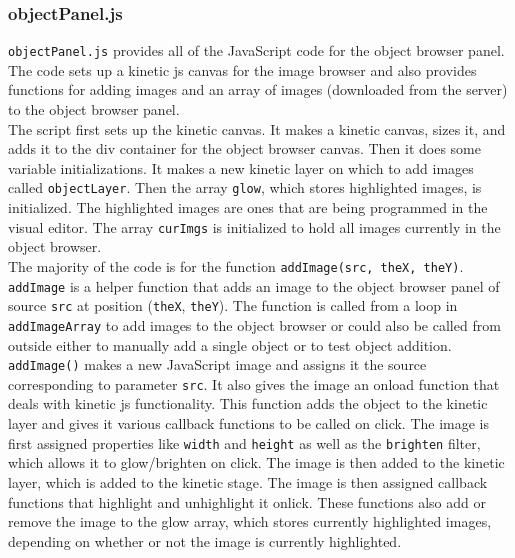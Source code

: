 \documentclass[12pt]{article}
\begin{document}
\subsubsection{objectPanel.js}

\texttt{objectPanel.js} provides all of the JavaScript code for the object browser panel. The code sets up a kinetic js canvas for the image browser and also provides functions for adding images and an array of images (downloaded from the server) to the object browser panel. \\

The script first sets up the kinetic canvas. It makes a kinetic canvas, sizes it, and adds it to the div container for the object browser canvas. Then it does some variable initializations. It makes a new kinetic layer on which to add images called \texttt{objectLayer}. Then the array \texttt{glow}, which stores highlighted images, is initialized. The highlighted images are ones that are being programmed in the visual editor. The array \texttt{curImgs} is initialized to hold all images currently in the object browser. \\

The majority of the code is for the function \texttt{addImage(src, theX, theY)}. \texttt{addImage} is a helper function that adds an image to the object browser panel of source \texttt{src} at position (\texttt{theX}, \texttt{theY}). The function is called from a loop in \texttt{addImageArray} to add images to the object browser or could also be called from outside either to manually add a single object or to test object addition. \\

\texttt{addImage()} makes a new JavaScript image and assigns it the source corresponding to parameter \texttt{src}. It also gives the image an onload function that deals with kinetic js functionality. This function adds the object to the kinetic layer and gives it various callback functions to be called on click. The image is first assigned properties like \texttt{width} and \texttt{height} as well as the \texttt{brighten} filter, which allows it to glow/brighten on click. The image is then added to the kinetic layer, which is added to the kinetic stage. The image is then assigned callback functions that highlight and unhighlight it onlick. These functions also add or remove the image to the glow array, which stores currently highlighted images, depending on whether or not the image is currently highlighted. \\
\end{document}
